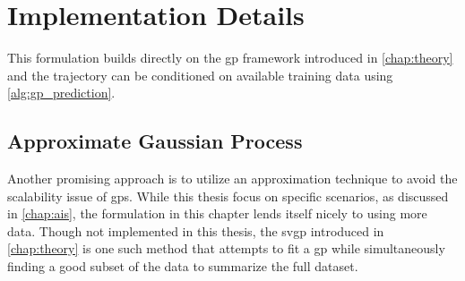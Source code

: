\section{Implementation Details}

This formulation builds directly on the \acrshort{gp} framework introduced in \cref{chap:theory} and the trajectory can be conditioned on available training data using \cref{alg:gp_prediction}. 

\subsection{Approximate Gaussian Process}
Another promising approach is to utilize an approximation technique to avoid the scalability issue of \acrshort{gp}s. While this thesis focus on specific scenarios, as discussed in \cref{chap:ais}, the formulation in this chapter lends itself nicely to using more data. Though not implemented in this thesis, the \acrshort{svgp} introduced in \cref{chap:theory} is one such method that attempts to fit a \acrshort{gp} while simultaneously finding a good subset of the data to summarize the full dataset.


